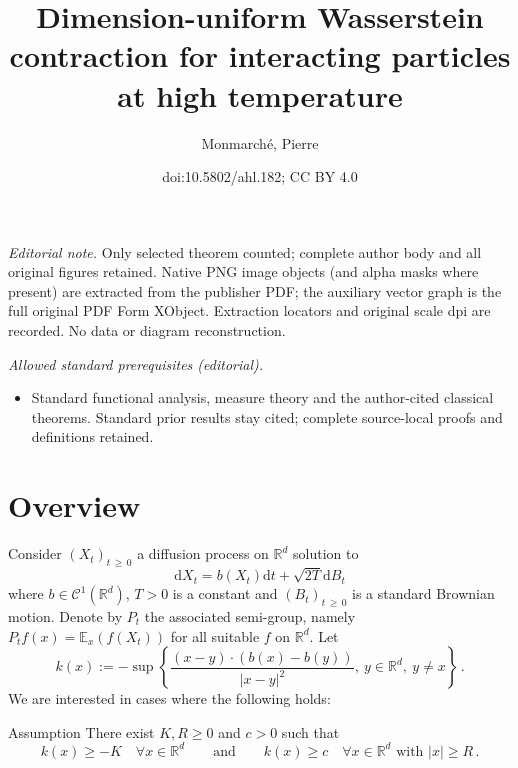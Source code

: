 \documentclass[10pt]{amsart}
\title{Dimension-uniform Wasserstein contraction for interacting particles at high temperature}
\author{Monmarché, Pierre}
\date{doi:10.5802/ahl.182; CC BY 4.0}
\theoremstyle{definition}\newtheorem{defi}[theo]{Definition}\newtheorem{rema}[theo]{Remark}\newtheorem{exam}[theo]{Example}\newtheorem{exem}[theo]{Example}\newtheorem{nota}[theo]{Notation}
\newcommand{\R}{\mathbb R}
\newcommand{\bbE}{\mathbb E}
\newcommand{\clC}{\mathcal C}
\newcommand{\dd}{\mathrm{d}}
\newcommand{\1}{\mathbbm{1}}
\let\oldforall\forall
\renewcommand*{\forall}{\mathrel{\oldforall}}
\begin{document}
\maketitle
\noindent\textit{Editorial note.} Only selected theorem counted; complete author body and all original figures retained. Native PNG image objects (and alpha masks where present) are extracted from the publisher PDF; the auxiliary vector graph is the full original PDF Form XObject. Extraction locators and original scale dpi are recorded. No data or diagram reconstruction.\par\medskip
\noindent\textit{Allowed standard prerequisites (editorial).}\begin{itemize}
\item Standard functional analysis, measure theory and the author-cited classical theorems. Standard prior results stay cited; complete source-local proofs and definitions retained.
\end{itemize}\medskip

\section{Overview}\label{sec1}

Consider $(X_t)_{t\,\geqslant\,0}$ a diffusion process on $\R^d$ solution to
\begin{equation}\label{eq:EDS}
\dd X_t = b(X_t) \dd t + \sqrt{2T}\dd B_t
\end{equation}
where $b\in\clC^1(\R^d)$, $T>0$ is a constant and $(B_t)_{t\,\geqslant\,0}$ is a standard Brownian motion. Denote by $P_t$ the associated semi-group, namely $P_t f(x) = \bbE_x( f(X_t))$ for all suitable $f$ on $\R^d$. Let
\begin{equation}\label{eq:defk}
k(x):= - \sup \left\{ \frac{ (x-y)\cdot \left( b(x)-b(y)\right) }{|x-y|^2},\ y\in\R^d,\ y\neq x\right\}\,.
\end{equation}
We are interested in cases where the following holds:

\begin{enonce}{Assumption}\label{Assu1}
There exist $K,R\geqslant 0$ and $c>0$ such that
\begin{equation}\label{eq:conditionk}
k(x) \geqslant -K\quad \forall x\in\R^d \qquad \text{and}\qquad k(x) \geqslant c \quad \forall x\in\R^d\text{ with }|x|\geqslant R\,.
\end{equation}
\end{enonce}
\end{document}
